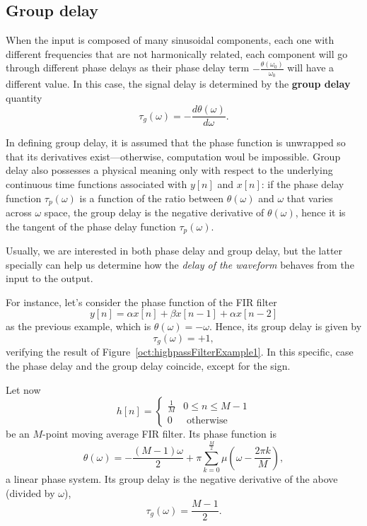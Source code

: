 \documentclass[\documentfontsize, twocolumn]{\classname}
\begin{document}
\subsection{Group delay}

When the input is composed of many sinusoidal components, each one with different frequencies that are not harmonically related, each component will go through different phase delays as their phase delay term $-\frac{\theta(\omega_0)}{\omega_0}$ will have a different value. In this case, the signal delay is determined by the \textbf{group delay} quantity
\begin{equation}\label{eqn:groupDelay}
    \tau_g(\omega) = - \frac{
        d\theta(\omega)
    } {
        d\omega
    }.
\end{equation}

In defining group delay, it is assumed that the phase function is unwrapped so that its derivatives exist---otherwise, computation woul be impossible. Group delay also possesses a physical meaning only with respect to the underlying continuous time functions associated with $y[n]$ and $x[n]$: if the phase delay function $\tau_p(\omega)$ is a function of the ratio between $\theta(\omega)$ and $\omega$ that varies across $\omega$ space, the group delay is the negative derivative of $\theta(\omega)$, hence it is the tangent of the phase delay function $\tau_p(\omega)$.

Usually, we are interested in both phase delay and group delay, but the latter specially can help us determine how the \emph{delay of the waveform} behaves from the input to the output.

For instance, let's consider the phase function of the FIR filter
\[
    y[n] = \alpha x[n] + \beta x[n-1] + \alpha x[n-2]
\]
as the previous example, which is $\theta(\omega) = -\omega$. Hence, its group delay is given by
\[
    \tau_g(\omega) = +1,
\]
verifying the result of Figure~\ref{oct:highpassFilterExample1}. In this specific, case the phase delay and the group delay coincide, except for the sign.

Let now 
\[
    h[n] = 
    \left\{
        \begin{array}{ll}
            \frac 1 M & 0 \leq n \leq M-1\\
            0 & \mbox{ otherwise}
        \end{array}
    \right.
\]
be an $M$-point moving average FIR filter. Its phase function is
\begin{equation}\label{eqn:mPointMovingAverageFilterPhaseFunction}
    \theta(\omega) = -\frac{(M-1)\omega}{2} + \pi\sum_{k=0}^{\frac M 2} \mu\left(\omega - \frac {2 \pi k}{M}\right),
\end{equation}
a linear phase system. Its group delay is the negative derivative of the above (divided by $\omega$),
\begin{equation}\label{eqn:mPointMovingAverageFilterGroupDelay}
    \tau_g(\omega) = \frac {M-1}{2}.
\end{equation}
\end{document}
